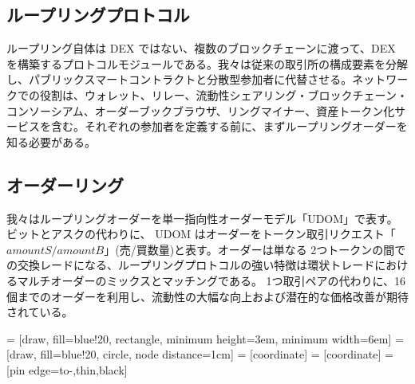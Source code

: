\documentclass{article}
\makeatletter
\newenvironment{figurehere}
 {\def\@captype{figure}}
 {}
\makeatother
\begin{document}
\begin{multicols}{2}
\section{ループリングプロトコル\label{sec:loopring_protocol}}
ループリング自体は DEX ではない、複数のブロックチェーンに渡って、DEX を構築するプロトコルモジュールである。我々は従来の取引所の構成要素を分解し、パブリックスマートコントラクトと分散型参加者に代替させる。ネットワークでの役割は、ウォレット、リレー、流動性シェアリング・ブロックチェーン・コンソーシアム、オーダーブックブラウザ、リングマイナー、資産トークン化サービスを含む。それぞれの参加者を定義する前に、まずループリングオーダーを知る必要がある。

\subsection{オーダーリング\label{sec:order_ring}}
我々はループリングオーダーを単一指向性オーダーモデル「UDOM」\cite{coinport2014udom}で表す。ビットとアスクの代わりに、 UDOM はオーダーをトークン取引リクエスト「$amountS/amountB$」(売/買数量)と表す。オーダーは単なる 2つトークンの間での交換レードになる、ループリングプロトコルの強い特徴は環状トレードにおけるマルチオーダーのミックスとマッチングである。 1つ取引ペアの代わりに、16 個までのオーダーを利用し、流動性の大幅な向上および潜在的な価格改善が期待されている。

\begin{center}
\begin{figurehere}
\centering
{} = [draw, fill=blue!20, rectangle, 
    minimum height=3em, minimum width=6em]
 = [draw, fill=blue!20, circle, node distance=1cm]
 = [coordinate]
 = [coordinate]
 = [pin edge={to-,thin,black}]

\end{figurehere}
\end{center}
\end{multicols}
\end{document}

